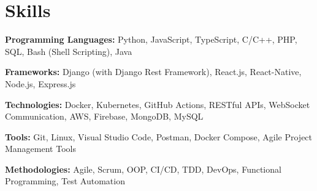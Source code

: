 \section{Skills}
\vspace{2pt}
\resumeSubHeadingListStart
\small{\item{

              \textbf{Programming Languages:}{ Python, JavaScript, TypeScript, C/C++, PHP, SQL, Bash (Shell Scripting), Java} \\ \vspace{3pt}

              \textbf{Frameworks:}{ Django (with Django Rest Framework), React.js, React-Native, Node.js, Express.js} \\ \vspace{3pt}

              \textbf{Technologies:}{ Docker, Kubernetes, GitHub Actions, RESTful APIs, WebSocket Communication, AWS, Firebase, MongoDB, MySQL} \\ \vspace{3pt}

              \textbf{Tools:}{ Git, Linux, Visual Studio Code, Postman, Docker Compose, Agile Project Management Tools} \\ \vspace{3pt}

              \textbf{Methodologies:}{ Agile, Scrum, OOP, CI/CD, TDD, DevOps, Functional Programming, Test Automation} \\ \vspace{3pt}

        }}
\resumeSubHeadingListEnd
